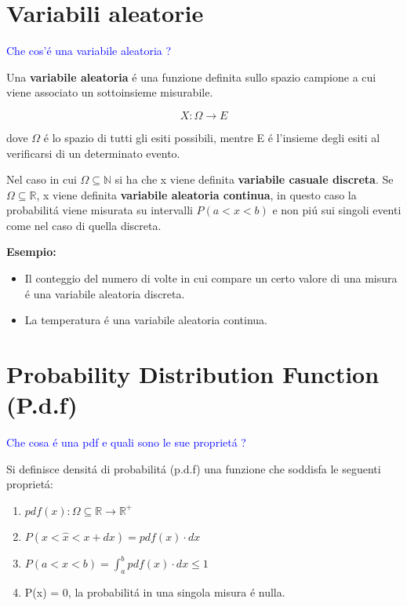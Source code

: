 \documentclass[11pt,a4paper]{book}
\begin{document}
\section{Variabili aleatorie}

\textcolor{blue}{Che cos'\'{e} una variabile aleatoria ?}\newline

Una \textbf{variabile aleatoria} \'{e} una funzione  definita sullo spazio campione a cui viene associato un sottoinsieme misurabile.

\begin{equation}
	X :  \Omega \rightarrow E
\end{equation}
 
 \noindent dove $\Omega$ \'{e} lo spazio di tutti gli esiti possibili, mentre E \'{e} l'insieme degli esiti al verificarsi di un determinato evento.\newline
 
 Nel caso in cui $\Omega \subseteq \mathbb{N}$ si ha che x viene definita \textbf{variabile casuale discreta}. \newline
 Se $\Omega \subseteq \mathbb{R}$, x viene definita \textbf{variabile aleatoria continua}, in questo caso la probabilit\'{a} viene misurata su intervalli $P(a<x<b)$ e non pi\'{u} sui singoli eventi come nel caso di quella discreta. \newline
 
 \noindent \textbf{Esempio:} 
 \begin{itemize}
 	\item Il conteggio del numero di volte in cui compare un certo valore di una misura \'{e} una variabile aleatoria discreta.
 	\item La temperatura \'{e} una variabile aleatoria continua. 
 \end{itemize}
 
 \section{Probability Distribution Function (P.d.f)}
 
 \textcolor{blue}{Che cosa \'{e} una pdf e quali sono le sue propriet\'{a} ?} \newline
 
 Si definisce densit\'{a} di probabilit\'{a} (p.d.f) una funzione che soddisfa le seguenti propriet\'{a}:
 
 \begin{enumerate}
 
 	\item $pdf(x): \Omega \subseteq \mathbb{R} \rightarrow \mathbb{R^+}$
 	\item $P(x < \hat{x} < x +dx) = pdf(x) \cdot dx$
 	\item $P(a < x < b) = \int_{a}^{b}{pdf(x) \cdot dx} \leq 1$
 	\item P(x) = 0, la probabilit\'{a} in una singola misura \'{e} nulla.
 		
 \end{enumerate}
 
\end{document}
